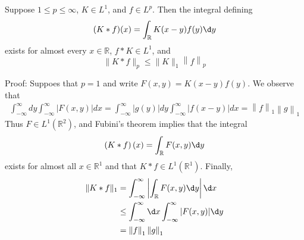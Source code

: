 \documentclass[12pt, a4paper, oneside]{book}
\begin{document}
\begin{theorem}
    Suppose $1\leq p \leq \infty $, $K\in L^1$, and $f \in L^p$. Then the integral defining
    \begin{equation*}(K*f)(x)= \int_\mathbb{R} K(x-y)f(y) \d y\end{equation*}
    exists for almost every $x\in \mathbb{R}$, $f*K\in L^1$, and
    \begin{equation*}
        \|K*f\|_p \leq \|K\|_1 \left\| f \right\|_p
    \end{equation*}

    Proof:
    Suppoes that $p=1$ and write $F(x,y) = K(x-y) f(y)$. We observe that
    \begin{equation*}
        \begin{aligned}
            \int_{-\infty}^{\infty} d y \int_{-\infty}^{\infty}|F(x, y)| d x=\int_{-\infty}^{\infty}|g(y)| d y \int_{-\infty}^{\infty}|f(x-y)| d x=\left\| f \right\|_1\left\| g \right\|_1
        \end{aligned}
    \end{equation*}
    Thus $F \in L^1\left(\mathbb{R}^2\right)$, and Fubini's theorem implies that the integral
    \begin{equation*}\left(K*f\right)(x)=\int_\mathbb{R} F(x,y) \d y\end{equation*}
    exists for almost all $x \in \mathbb{R}^1$ and that $K*f \in L^1\left(\mathbb{R}^1\right)$. Finally,
    \begin{equation*}
        \begin{aligned}
            \|K*f\|_1 & =\int_{-\infty}^{\infty} \left|\int_\mathbb{R} F(x,y) \d y \right|\d x    \\
                      & \leq \int_{-\infty}^{\infty} \d  x \int_{-\infty}^{\infty}|F(x, y)| \d  y \\
                      & =\left\| f \right\|_1\left\| g \right\|_1
        \end{aligned}
    \end{equation*}


\end{theorem}
\end{document}

